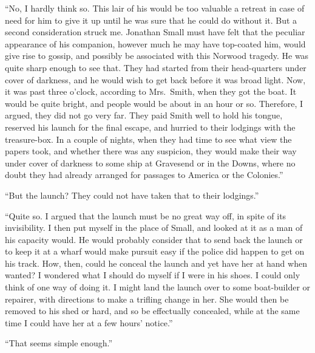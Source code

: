 \documentclass[12pt,english,oneside]{book}
\begin{document}
{}``No, I hardly think so. This lair of his would be too valuable
a retreat in case of need for him to give it up until he was sure
that he could do without it. But a second consideration struck me.
Jonathan Small must have felt that the peculiar appearance of his
companion, however much he may have top-coated him, would give rise
to gossip, and possibly be associated with this Norwood tragedy. He
was quite sharp enough to see that. They had started from their head-quarters
under cover of darkness, and he would wish to get back before it was
broad light. Now, it was past three o'clock, according to Mrs.\ Smith,
when they got the boat. It would be quite bright, and people would
be about in an hour or so. Therefore, I argued, they did not go very
far. They paid Smith well to hold his tongue, reserved his launch
for the final escape, and hurried to their lodgings with the treasure-box.
In a couple of nights, when they had time to see what view the papers
took, and whether there was any suspicion, they would make their way
under cover of darkness to some ship at Gravesend or in the Downs,
where no doubt they had already arranged for passages to America or
the Colonies.''

{}``But the launch? They could not have taken that to their lodgings.''

{}``Quite so. I argued that the launch must be no great way off,
in spite of its invisibility. I then put myself in the place of Small,
and looked at it as a man of his capacity would. He would probably
consider that to send back the launch or to keep it at a wharf would
make pursuit easy if the police did happen to get on his track. How,
then, could he conceal the launch and yet have her at hand when wanted?
I wondered what I should do myself if I were in his shoes. I could
only think of one way of doing it. I might land the launch over to
some boat-builder or repairer, with directions to make a trifling
change in her. She would then be removed to his shed or hard, and
so be effectually concealed, while at the same time I could have her
at a few hours' notice.''

{}``That seems simple enough.''
\end{document}
